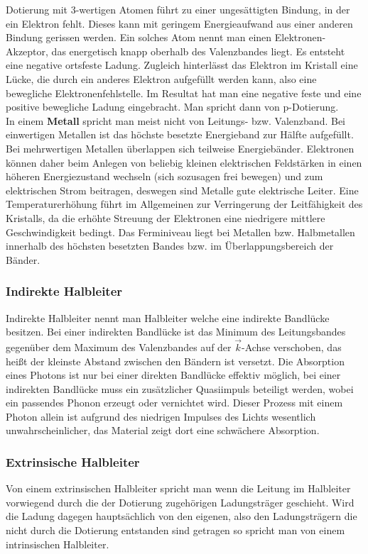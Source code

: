 \documentclass[12pt]{article}
\begin{document}
Dotierung mit 3-wertigen Atomen führt zu einer ungesättigten Bindung, in der ein Elektron fehlt. Dieses kann mit geringem
Energieaufwand aus einer anderen Bindung gerissen werden. Ein solches Atom nennt man einen Elektronen-Akzeptor, das
energetisch knapp oberhalb des Valenzbandes liegt. Es entsteht eine negative ortsfeste Ladung. Zugleich hinterlässt das
Elektron im Kristall eine Lücke, die durch ein anderes Elektron aufgefüllt werden kann, also eine bewegliche
Elektronenfehlstelle. Im Resultat hat man eine negative feste und eine positive bewegliche Ladung eingebracht.
Man spricht dann von p-Dotierung.\\

In einem \textbf{Metall} spricht man meist nicht von Leitungs- bzw. Valenzband. Bei einwertigen Metallen ist das höchste
besetzte Energieband zur Hälfte aufgefüllt. Bei mehrwertigen Metallen überlappen sich teilweise Energiebänder. Elektronen
können daher beim Anlegen von beliebig kleinen elektrischen Feldstärken in einen höheren Energiezustand wechseln (sich
sozusagen frei bewegen) und zum elektrischen Strom beitragen, deswegen sind Metalle gute elektrische Leiter. Eine
Temperaturerhöhung führt im Allgemeinen zur Verringerung der Leitfähigkeit des Kristalls, da die erhöhte Streuung der
Elektronen eine niedrigere mittlere Geschwindigkeit bedingt. Das Ferminiveau liegt bei Metallen bzw. Halbmetallen
innerhalb des höchsten besetzten Bandes bzw. im Überlappungsbereich der Bänder.

\subsubsection{Indirekte Halbleiter}
Indirekte Halbleiter nennt man Halbleiter welche eine indirekte Bandlücke besitzen.
Bei einer indirekten Bandlücke ist das Minimum des Leitungsbandes gegenüber dem Maximum des Valenzbandes auf der $\vec{k}$-Achse verschoben, das heißt der kleinste Abstand zwischen den Bändern ist versetzt. Die Absorption eines Photons ist nur bei einer direkten Bandlücke effektiv möglich, bei einer indirekten Bandlücke muss ein zusätzlicher Quasiimpuls beteiligt werden, wobei ein passendes Phonon erzeugt oder vernichtet wird. Dieser Prozess mit einem Photon allein ist aufgrund des niedrigen Impulses des Lichts wesentlich unwahrscheinlicher, das Material zeigt dort eine schwächere Absorption.

\subsubsection{Extrinsische Halbleiter}
Von einem extrinsischen Halbleiter spricht man wenn die Leitung im Halbleiter vorwiegend durch die der Dotierung zugehörigen Ladungsträger geschieht. Wird die Ladung dagegen hauptsächlich von den eigenen, also den Ladungsträgern die nicht durch die Dotierung entstanden sind getragen so spricht man von einem intrinsischen Halbleiter.
\end{document}
